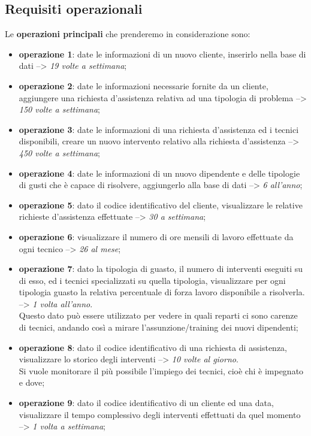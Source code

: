 \documentclass[legalpaper]{article}
\begin{document}
	\subsection{Requisiti operazionali}
	Le \textbf{operazioni principali} che prenderemo in considerazione sono:
	\begin{itemize}
		\item \textbf{operazione 1}: date le informazioni di un nuovo cliente, inserirlo nella base di dati --> \textit{19 volte a settimana};
		\item \textbf{operazione 2}: date le informazioni necessarie fornite da un cliente, aggiungere una richiesta d'assistenza relativa ad una tipologia di problema --> \textit{150 volte a settimana};
		\item \textbf{operazione 3}: date le informazioni di una richiesta d'assistenza ed i tecnici disponibili, creare un nuovo intervento relativo alla richiesta d'assistenza --> \textit{450 volte a settimana};
		\item \textbf{operazione 4}: date le informazioni di un nuovo dipendente e delle tipologie di gusti che è capace di risolvere, aggiungerlo alla base di dati --> \textit{6 all'anno};
		\item \textbf{operazione 5}: dato il codice identificativo del cliente, visualizzare le relative richieste d'assistenza effettuate --> \textit{30 a settimana};
		\item \textbf{operazione 6}: visualizzare il numero di ore mensili di lavoro effettuate da ogni tecnico --> \textit{26 al mese};
		\item \textbf{operazione 7}: dato la tipologia di guasto, il numero di interventi eseguiti su di esso, ed i tecnici specializzati su quella tipologia, visualizzare per ogni tipologia guasto la relativa percentuale di forza lavoro disponibile a risolverla.  --> \textit{1 volta all'anno}. \\ Questo dato può essere utilizzato per vedere in quali reparti ci sono carenze di tecnici, andando così a mirare l'assunzione/training dei nuovi dipendenti;
		\item \textbf{operazione 8}: dato il codice identificativo di una richiesta di assistenza, visualizzare lo storico degli interventi --> \textit{10 volte al giorno}. \\Si vuole monitorare il più possibile l'impiego dei tecnici, cioè chi è impegnato e dove;
		\item \textbf{operazione 9}: dato il codice identificativo di un cliente ed una data, visualizzare il tempo complessivo degli interventi effettuati da quel momento --> \textit{1 volta a settimana};
		
	\end{itemize}
\end{document}
